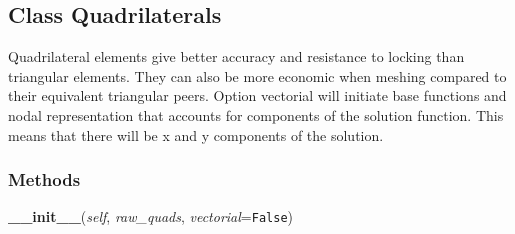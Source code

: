 

\subsection{Class Quadrilaterals}

    \label{Classes:Quadrilaterals}
Quadrilateral elements give better accuracy and resistance to locking than 
triangular elements. They can also be more economic when meshing compared 
to their equivalent triangular peers. Option vectorial will initiate base 
functions and nodal representation that accounts for components of the 
solution function. This means that there will be x and y components of the 
solution.



  \subsubsection{Methods}

    \label{Classes:Quadrilaterals:__init__}

    \vspace{0.5ex}

\hspace{.8\funcindent}\begin{boxedminipage}{\funcwidth}

    \raggedright \textbf{\_\_init\_\_}(\textit{self}, \textit{raw\_quads}, \textit{vectorial}={\tt False})

\setlength{\parskip}{2ex}
\setlength{\parskip}{1ex}
    \end{boxedminipage}

    \label{Classes:Quadrilaterals:build_local_stiffness}

